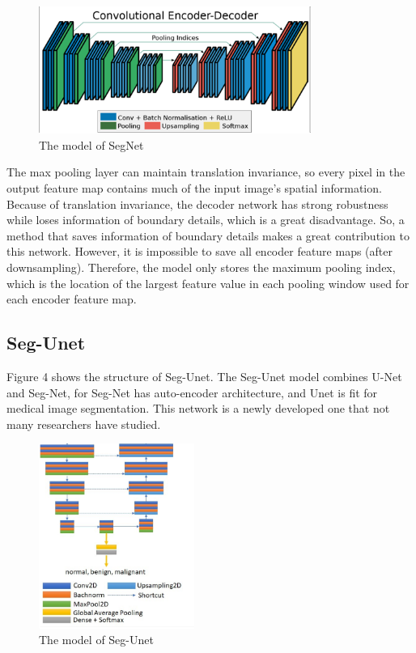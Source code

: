 \documentclass{article}
\begin{document}
\begin{figure}[H]
    \centering
    \includegraphics[width = 3.5in]{SegNet}
    \caption{The model of SegNet}
    \label{The model of SegNet}
\end{figure}

The max pooling layer can maintain translation invariance, so every pixel in the output feature map contains much of the input image's spatial information.
Because of translation invariance, the decoder network has strong robustness while loses information of boundary details, which is a great disadvantage.
So, a method that saves information of boundary details makes a great contribution to this network.
However, it is impossible to save all encoder feature maps (after downsampling).
Therefore, the model only stores the maximum pooling index, which is the location of the largest feature value in each pooling window used for each encoder feature map.

\subsection{Seg-Unet}
Figure 4 shows the structure of Seg-Unet. The Seg-Unet model combines U-Net and Seg-Net, for Seg-Net has auto-encoder architecture, and Unet is fit for medical image segmentation.
This network is a newly developed one that not many researchers have studied.

\begin{figure}[H]
    \centering
    \includegraphics[width = 2.0in]{Seg-Unet}
    \caption{The model of Seg-Unet}
    \label{The model of Seg-Unet}
\end{figure}
\end{document}
